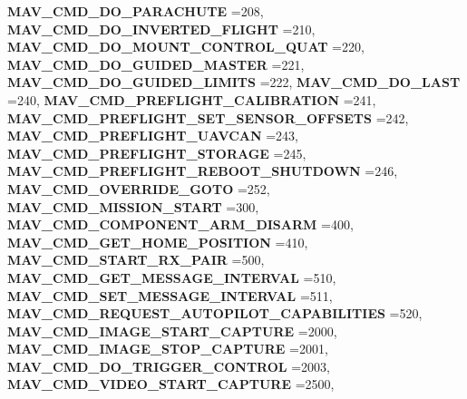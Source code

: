 \begin{DoxyCompactItemize}
\textbf{ M\+A\+V\+\_\+\+C\+M\+D\+\_\+\+D\+O\+\_\+\+P\+A\+R\+A\+C\+H\+U\+TE} =208, 
\textbf{ M\+A\+V\+\_\+\+C\+M\+D\+\_\+\+D\+O\+\_\+\+I\+N\+V\+E\+R\+T\+E\+D\+\_\+\+F\+L\+I\+G\+HT} =210, 
\textbf{ M\+A\+V\+\_\+\+C\+M\+D\+\_\+\+D\+O\+\_\+\+M\+O\+U\+N\+T\+\_\+\+C\+O\+N\+T\+R\+O\+L\+\_\+\+Q\+U\+AT} =220, 
\newline
\textbf{ M\+A\+V\+\_\+\+C\+M\+D\+\_\+\+D\+O\+\_\+\+G\+U\+I\+D\+E\+D\+\_\+\+M\+A\+S\+T\+ER} =221, 
\textbf{ M\+A\+V\+\_\+\+C\+M\+D\+\_\+\+D\+O\+\_\+\+G\+U\+I\+D\+E\+D\+\_\+\+L\+I\+M\+I\+TS} =222, 
\textbf{ M\+A\+V\+\_\+\+C\+M\+D\+\_\+\+D\+O\+\_\+\+L\+A\+ST} =240, 
\textbf{ M\+A\+V\+\_\+\+C\+M\+D\+\_\+\+P\+R\+E\+F\+L\+I\+G\+H\+T\+\_\+\+C\+A\+L\+I\+B\+R\+A\+T\+I\+ON} =241, 
\newline
\textbf{ M\+A\+V\+\_\+\+C\+M\+D\+\_\+\+P\+R\+E\+F\+L\+I\+G\+H\+T\+\_\+\+S\+E\+T\+\_\+\+S\+E\+N\+S\+O\+R\+\_\+\+O\+F\+F\+S\+E\+TS} =242, 
\textbf{ M\+A\+V\+\_\+\+C\+M\+D\+\_\+\+P\+R\+E\+F\+L\+I\+G\+H\+T\+\_\+\+U\+A\+V\+C\+AN} =243, 
\textbf{ M\+A\+V\+\_\+\+C\+M\+D\+\_\+\+P\+R\+E\+F\+L\+I\+G\+H\+T\+\_\+\+S\+T\+O\+R\+A\+GE} =245, 
\textbf{ M\+A\+V\+\_\+\+C\+M\+D\+\_\+\+P\+R\+E\+F\+L\+I\+G\+H\+T\+\_\+\+R\+E\+B\+O\+O\+T\+\_\+\+S\+H\+U\+T\+D\+O\+WN} =246, 
\newline
\textbf{ M\+A\+V\+\_\+\+C\+M\+D\+\_\+\+O\+V\+E\+R\+R\+I\+D\+E\+\_\+\+G\+O\+TO} =252, 
\textbf{ M\+A\+V\+\_\+\+C\+M\+D\+\_\+\+M\+I\+S\+S\+I\+O\+N\+\_\+\+S\+T\+A\+RT} =300, 
\textbf{ M\+A\+V\+\_\+\+C\+M\+D\+\_\+\+C\+O\+M\+P\+O\+N\+E\+N\+T\+\_\+\+A\+R\+M\+\_\+\+D\+I\+S\+A\+RM} =400, 
\textbf{ M\+A\+V\+\_\+\+C\+M\+D\+\_\+\+G\+E\+T\+\_\+\+H\+O\+M\+E\+\_\+\+P\+O\+S\+I\+T\+I\+ON} =410, 
\newline
\textbf{ M\+A\+V\+\_\+\+C\+M\+D\+\_\+\+S\+T\+A\+R\+T\+\_\+\+R\+X\+\_\+\+P\+A\+IR} =500, 
\textbf{ M\+A\+V\+\_\+\+C\+M\+D\+\_\+\+G\+E\+T\+\_\+\+M\+E\+S\+S\+A\+G\+E\+\_\+\+I\+N\+T\+E\+R\+V\+AL} =510, 
\textbf{ M\+A\+V\+\_\+\+C\+M\+D\+\_\+\+S\+E\+T\+\_\+\+M\+E\+S\+S\+A\+G\+E\+\_\+\+I\+N\+T\+E\+R\+V\+AL} =511, 
\textbf{ M\+A\+V\+\_\+\+C\+M\+D\+\_\+\+R\+E\+Q\+U\+E\+S\+T\+\_\+\+A\+U\+T\+O\+P\+I\+L\+O\+T\+\_\+\+C\+A\+P\+A\+B\+I\+L\+I\+T\+I\+ES} =520, 
\newline
\textbf{ M\+A\+V\+\_\+\+C\+M\+D\+\_\+\+I\+M\+A\+G\+E\+\_\+\+S\+T\+A\+R\+T\+\_\+\+C\+A\+P\+T\+U\+RE} =2000, 
\textbf{ M\+A\+V\+\_\+\+C\+M\+D\+\_\+\+I\+M\+A\+G\+E\+\_\+\+S\+T\+O\+P\+\_\+\+C\+A\+P\+T\+U\+RE} =2001, 
\textbf{ M\+A\+V\+\_\+\+C\+M\+D\+\_\+\+D\+O\+\_\+\+T\+R\+I\+G\+G\+E\+R\+\_\+\+C\+O\+N\+T\+R\+OL} =2003, 
\textbf{ M\+A\+V\+\_\+\+C\+M\+D\+\_\+\+V\+I\+D\+E\+O\+\_\+\+S\+T\+A\+R\+T\+\_\+\+C\+A\+P\+T\+U\+RE} =2500, 

\end{DoxyCompactItemize}

